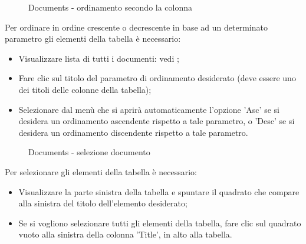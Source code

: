 \documentclass[10pt, a4paper]{article}
\begin{document}
\begin{figure}[H]
    \centering  
    \caption{Documents - ordinamento secondo la colonna}
    \label{img:ordDocsColumns}
\end{figure}
Per ordinare in ordine crescente o decrescente in base ad un determinato parametro gli elementi della tabella è necessario:
\begin{itemize}
    \item Visualizzare lista di tutti i documenti: vedi ;
    \item Fare clic sul titolo del parametro di ordinamento desiderato (deve essere uno dei titoli delle colonne della tabella);
    \item Selezionare dal menù che si aprirà automaticamente l'opzione 'Asc' se si desidera un ordinamento ascendente rispetto a tale parametro, o 'Desc' se si desidera un ordinamento discendente rispetto a tale parametro.
\end{itemize}
 \begin{figure}[H]
    \centering  
    \caption{Documents - selezione documento}
    \label{img:selDocs}
\end{figure}
 Per selezionare gli elementi della tabella è necessario:
\begin{itemize}
    \item Visualizzare la parte sinistra della tabella e spuntare il quadrato che compare alla sinistra del titolo dell'elemento desiderato;
    \item Se si vogliono selezionare tutti gli elementi della tabella, fare clic sul quadrato vuoto alla sinistra della colonna 'Title', in alto alla tabella.
\end{itemize}
\end{document}

